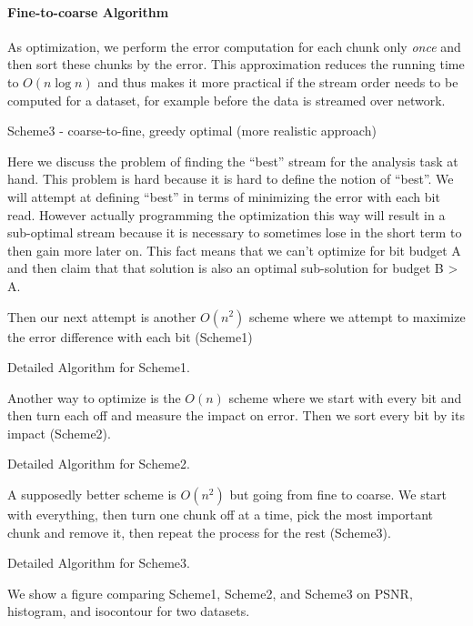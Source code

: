 \paragraph*{Fine-to-coarse Algorithm}

As optimization, we perform the error computation for each chunk only {\em once} and then sort these chunks
by the error. This approximation reduces the running time to $O(n \log n)$ and thus makes it more practical if
the stream order needs to be computed for a dataset, for example before the data is streamed over network.



Scheme3 - coarse-to-fine, greedy optimal (more realistic approach)


Here we discuss the problem of finding the ``best'' stream for the analysis task at hand. This problem is hard because it is hard to define the notion of ``best''. We will attempt at defining ``best'' in terms of minimizing the error with each bit read. However actually programming the optimization this way will result in a sub-optimal stream because it is necessary to sometimes lose in the short term to then gain more later on. This fact means that we can't optimize for bit budget A and then claim that that solution is also an optimal sub-solution for budget B > A.

Then our next attempt is another $O(n^2)$ scheme where we attempt to maximize the error difference with each bit (Scheme1)

Detailed Algorithm for Scheme1.

Another way to optimize is the $O(n)$ scheme where we start with every bit and then turn each off and measure the impact on error. Then we sort every bit by its impact (Scheme2).

Detailed Algorithm for Scheme2.

A supposedly better scheme is $O(n^2)$ but going from fine to coarse. We start with everything, then turn one chunk off at a time, pick the most important chunk and remove it, then repeat the process for the rest (Scheme3).

Detailed Algorithm for Scheme3.

We show a figure comparing Scheme1, Scheme2, and Scheme3 on PSNR, histogram, and isocontour for two datasets.
